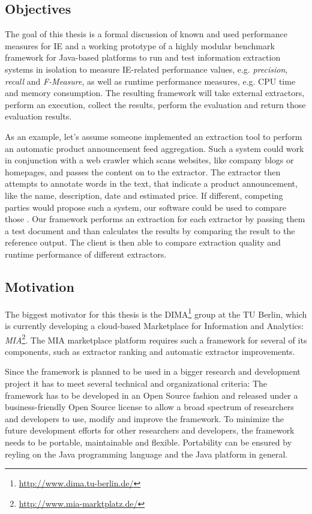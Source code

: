 \subsection{Objectives}
The goal of this thesis is a formal discussion of known and used performance measures for IE and a working prototype of a highly modular benchmark framework for Java-based platforms to run and test information extraction systems in isolation to measure IE-related performance values, e.g. \textit{precision}, \textit{recall} and \textit{F-Measure}, as well as runtime performance measures, e.g. CPU time and memory consumption. The resulting framework will take external extractors, perform an execution, collect the results, perform the evaluation and return those evaluation results.

As an example, let's assume someone implemented an extraction tool to perform an automatic product announcement feed aggregation. Such a system could work in conjunction with a web crawler which scans websites, like company blogs or homepages, and passes the content on to the extractor. The extractor then attempts to annotate words in the text, that indicate a product announcement, like the name, description, date and estimated price. If different, competing parties would propose such a system, our software could be used to compare those . Our framework performs an extraction for each extractor by passing them a test document and than calculates the results by comparing the result to the reference output. The client is then able to compare extraction quality and runtime performance of different extractors.

\subsection{Motivation}
The biggest motivator for this thesis is the \gls{DIMA}\footnote{\url{http://www.dima.tu-berlin.de/}} group at the TU Berlin, which is currently developing a cloud-based Marketplace for Information and Analytics: \textit{MIA}\footnote{\url{http://www.mia-marktplatz.de/}}. The MIA marketplace platform requires such a framework for several of its components, such as extractor ranking and automatic extractor improvements.

Since the framework is planned to be used in a bigger research and development project it has to meet several technical and organizational criteria: The framework has to be developed in an Open Source fashion and released under a business-friendly Open Source license to allow a broad spectrum of researchers and developers to use, modify and improve the framework. To minimize the future development efforts for other researchers and developers, the framework needs to be portable, maintainable and flexible. Portability can be ensured by reyling on the Java programming language and the Java platform in general.

